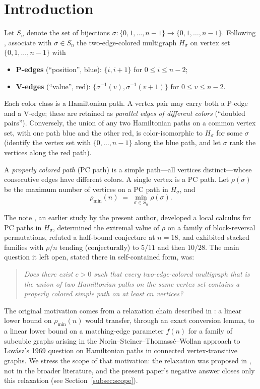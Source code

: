 \documentclass[11pt]{article}
\theoremstyle{definition}
\newcommand{\pmin}{\rho_{\min}}
\newcommand{\inv}[1]{#1^{-1}}
\begin{document}
\section{Introduction}\label{sec:intro}

Let $S_n$ denote the set of bijections
$\sigma\colon \{0,1,\dots,n-1\}\to\{0,1,\dots,n-1\}$.
Following \cite{Liz26}, associate with $\sigma \in S_n$ the two-edge-colored multigraph
$H_\sigma$ on vertex set $\{0,1,\dots,n-1\}$ with
\begin{itemize}
\item \textbf{P-edges} (``position'', blue): $\{i, i+1\}$ for $0 \le i \le n-2$;
\item \textbf{V-edges} (``value'', red): $\{\inv\sigma(v), \inv\sigma(v+1)\}$ for
$0 \le v \le n-2$.
\end{itemize}
Each color class is a Hamiltonian path. A vertex pair may carry both a P-edge and a
V-edge; these are retained as \emph{parallel edges of different colors} (``doubled
pairs''). Conversely, the union of any two Hamiltonian paths on a common vertex set,
with one path blue and the other red, is color-isomorphic to $H_\sigma$ for some
$\sigma$ (identify the vertex set with $\{0,\dots,n-1\}$ along the blue path, and let
$\sigma$ rank the vertices along the red path).

A \emph{properly colored path} (PC path) is a simple path---all vertices
distinct---whose consecutive edges have different colors. A single vertex is a PC
path. Let $\rho(\sigma)$ be the maximum number of vertices on a PC path in $H_\sigma$,
and
\[
\pmin(n) \;=\; \min_{\sigma\in S_n} \rho(\sigma) .
\]

The note \cite{Liz26}, an earlier study by the present author, developed a local
calculus for PC paths in $H_\sigma$, determined the extremal value of $\rho$ on a
family of block-reversal permutations, refuted a half-bound conjecture at $n = 18$,
and exhibited stacked families with $\rho/n$ tending (conjecturally) to $5/11$ and
then $10/28$. The main question it left open, stated there in self-contained form,
was:

\begin{quote}
\emph{Does there exist $c>0$ such that every two-edge-colored multigraph that is the
union of two Hamiltonian paths on the same vertex set contains a properly colored
simple path on at least $cn$ vertices?}
\end{quote}

The original motivation comes from a relaxation chain described in \cite{Liz26}: a
linear lower bound on $\pmin(n)$ would transfer, through an exact conversion lemma, to
a linear lower bound on a matching-edge parameter $f(n)$ for a family of subcubic
graphs arising in the Norin--Steiner--Thomass\'e--Wollan approach \cite{NSTW25} to
Lov\'asz's 1969 question \cite{Lov70} on Hamiltonian paths in connected
vertex-transitive graphs. We stress the scope of that motivation: the relaxation was
proposed in \cite{Liz26}, not in the broader literature, and the present paper's
negative answer closes only this relaxation (see Section~\ref{subsec:scope}).
\end{document}
